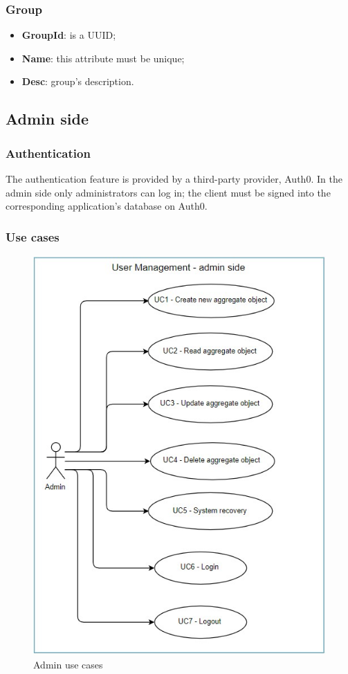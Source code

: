 \subsubsection{Group}
\begin{itemize}
	\item \textbf{GroupId}: is a UUID;
	\item \textbf{Name}: this attribute must be unique;
	\item \textbf{Desc}: group's description.
\end{itemize}

\subsection{Admin side}
\subsubsection{Authentication}
The authentication feature is provided by a third-party provider, Auth0. In the admin side only administrators can log in; the client must be signed into the corresponding application's database on Auth0.
\subsubsection{Use cases}

\begin{figure}[H]
	\centering
	\includegraphics[scale=1.2]{../Img/UC_admin}
	\caption{Admin use cases}\label{}
\end{figure}

